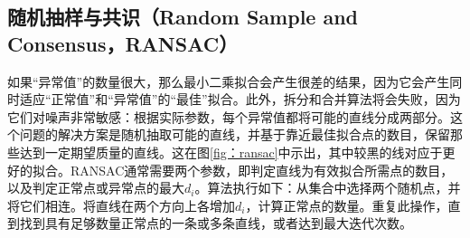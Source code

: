 
\subsection{随机抽样与共识（Random Sample and Consensus，RANSAC）}

如果“异常值”的数量很大，那么最小二乘拟合会产生很差的结果，因为它会产生同时适应“正常值”和“异常值”的“最佳”拟合。此外，拆分和合并算法将会失败，因为它们对噪声非常敏感：根据实际参数，每个异常值都将可能的直线分成两部分。这个问题的解决方案是随机抽取可能的直线，并基于靠近最佳拟合点的数目，保留那些达到一定期望质量的直线。这在图\ref{fig：ransac}中示出，其中较黑的线对应于更好的拟合。RANSAC通常需要两个参数，即判定直线为有效拟合所需点的数目，以及判定正常点或异常点的最大$d_i$。算法执行如下：从集合中选择两个随机点，并将它们相连。将直线在两个方向上各增加$d_i$，计算正常点的数量。重复此操作，直到找到具有足够数量正常点的一条或多条直线，或者达到最大迭代次数。


